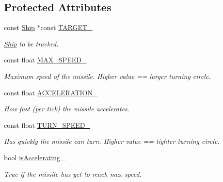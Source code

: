 \subsection*{Protected Attributes}
\begin{DoxyCompactItemize}
\item 
\hypertarget{class_missile_ad655d9b73602460ac7f4c7be86feb6dd}{}const \hyperlink{class_ship}{Ship} $\ast$const \hyperlink{class_missile_ad655d9b73602460ac7f4c7be86feb6dd}{T\+A\+R\+G\+E\+T\+\_\+}\label{class_missile_ad655d9b73602460ac7f4c7be86feb6dd}

\begin{DoxyCompactList}\small\item\em \hyperlink{class_ship}{Ship} to be tracked. \end{DoxyCompactList}\item 
\hypertarget{class_missile_ab1c0fd40b3e3ab420ec4402e427037b6}{}const float \hyperlink{class_missile_ab1c0fd40b3e3ab420ec4402e427037b6}{M\+A\+X\+\_\+\+S\+P\+E\+E\+D\+\_\+}\label{class_missile_ab1c0fd40b3e3ab420ec4402e427037b6}

\begin{DoxyCompactList}\small\item\em Maximum speed of the missile. Higher value == larger turning circle. \end{DoxyCompactList}\item 
\hypertarget{class_missile_abf37317e40a4a9c947ee868edb7db135}{}const float \hyperlink{class_missile_abf37317e40a4a9c947ee868edb7db135}{A\+C\+C\+E\+L\+E\+R\+A\+T\+I\+O\+N\+\_\+}\label{class_missile_abf37317e40a4a9c947ee868edb7db135}

\begin{DoxyCompactList}\small\item\em How fast (per tick) the missile accelerates. \end{DoxyCompactList}\item 
\hypertarget{class_missile_a78806f677e77faa9b24a23962798ee7f}{}const float \hyperlink{class_missile_a78806f677e77faa9b24a23962798ee7f}{T\+U\+R\+N\+\_\+\+S\+P\+E\+E\+D\+\_\+}\label{class_missile_a78806f677e77faa9b24a23962798ee7f}

\begin{DoxyCompactList}\small\item\em Has quickly the missile can turn. Higher value == tighter turning circle. \end{DoxyCompactList}\item 
\hypertarget{class_missile_a157cb7f39f14587fc49f2d7b75ab68ab}{}bool \hyperlink{class_missile_a157cb7f39f14587fc49f2d7b75ab68ab}{is\+Accelerating\+\_\+}\label{class_missile_a157cb7f39f14587fc49f2d7b75ab68ab}

\begin{DoxyCompactList}\small\item\em True if the missile has yet to reach max speed. \end{DoxyCompactList}\end{DoxyCompactItemize}
